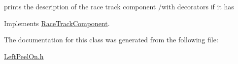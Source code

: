 prints the description of the race track component /with decorators if it has 

Implements \mbox{\hyperlink{class_race_track_component_a02a8d9520cfd80f31dd94b5fa1e76d47}{Race\+Track\+Component}}.



The documentation for this class was generated from the following file\+:\begin{DoxyCompactItemize}
\item 
\mbox{\hyperlink{_left_peel_on_8h}{Left\+Peel\+On.\+h}}\end{DoxyCompactItemize}
